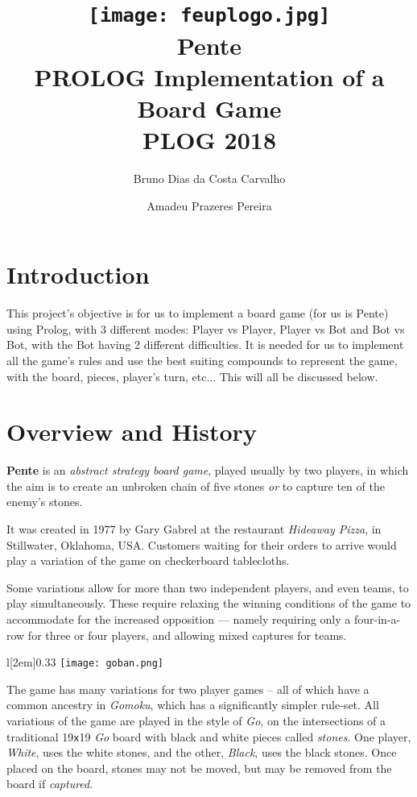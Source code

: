\documentclass[12pt,a4paper,notitlepage]{article}
\title{
	\vspace{-2\baselineskip}
	\texttt{[image: feuplogo.jpg]}\\
	{\Huge Pente}\\
	{\Large PROLOG Implementation of a Board Game}\\
	{\normalsize PLOG 2018}
}
\author{
	Bruno Dias da Costa Carvalho\hspace*{1.5em}\text{up201606517}
	\and
	Amadeu Prazeres Pereira\hspace*{1.5em}\text{up201605646} 
}
\newcommand*{\boardsize}[1]{#1\texttt{x}#1}
\begin{document}
\maketitle
\thispagestyle{empty}
\tableofcontents

\section{Introduction}
\label{sec:introduction}

This project's objective is for us to implement a board game (for us is Pente) using Prolog, with 3 different modes: Player vs Player, Player vs Bot and Bot vs Bot, with the Bot having 2 different difficulties.
  It is needed for us to implement all the game's rules and use the best suiting compounds to represent the game, with the board, pieces, player's turn, etc...
This will all be discussed below.

\section{Overview and History}
\label{sec:overview}

\textbf{Pente} is an \textit{abstract strategy board game}, played usually by two players, in which the aim is to create an unbroken chain of five stones \emph{or} to capture ten of the enemy's stones.

It was created in 1977 by Gary Gabrel at the restaurant \textsl{Hideaway Pizza}, in Stillwater, Oklahoma, USA.\supercite{pente-wikipedia}
Customers waiting for their orders to arrive would play a variation of the game on checkerboard tablecloths.\supercite{pente-wikipedia}

Some variations allow for more than two independent players, and even teams, to play simultaneously. These require relaxing the winning conditions of the game to accommodate for the increased opposition --- namely requiring only a four-in-a-row for three or four players, and allowing mixed captures for teams.\supercite{pente-winning-moves}

\begin{wrapfigure}[12]{l}[2em]{0.33\textwidth}
	\vspace*{-1\baselineskip}
	\texttt{[image: goban.png]}
	\caption{\boardsize{19} \textit{Go} board. \label{fig:goban}}
\end{wrapfigure}

The game has many variations for two player games -- all of which have a common ancestry in \textit{Gomoku}, which has a significantly simpler rule-set.
All variations of the game are played in the style of \textit{Go}, on the intersections of a traditional \boardsize{19} \emph{Go} board with black and white pieces called \emph{stones}. One player, \textsl{White}, uses the white stones, and the other, \textsl{Black}, uses the black stones. Once placed on the board, stones may not be moved, but may be removed from the board if \emph{captured}.
\end{document}
